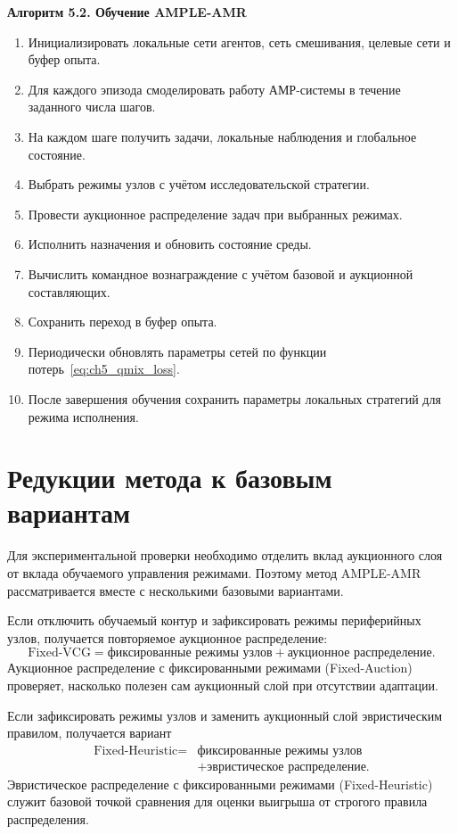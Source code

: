 \textbf{Алгоритм 5.2. Обучение AMPLE-AMR}
\begin{enumerate}
    \item Инициализировать локальные сети агентов, сеть смешивания, целевые сети и буфер опыта.
    \item Для каждого эпизода смоделировать работу АМР-системы в течение заданного числа шагов.
    \item На каждом шаге получить задачи, локальные наблюдения и глобальное состояние.
    \item Выбрать режимы узлов с учётом исследовательской стратегии.
    \item Провести аукционное распределение задач при выбранных режимах.
    \item Исполнить назначения и обновить состояние среды.
    \item Вычислить командное вознаграждение с учётом базовой и аукционной составляющих.
    \item Сохранить переход в буфер опыта.
    \item Периодически обновлять параметры сетей по функции потерь~\eqref{eq:ch5_qmix_loss}.
    \item После завершения обучения сохранить параметры локальных стратегий для режима исполнения.
\end{enumerate}

\section{Редукции метода к базовым вариантам}

Для экспериментальной проверки необходимо отделить вклад аукционного слоя от вклада обучаемого управления режимами. Поэтому метод AMPLE-AMR рассматривается вместе с несколькими базовыми вариантами.

Если отключить обучаемый контур и зафиксировать режимы периферийных узлов, получается повторяемое аукционное распределение:
\begin{equation}
    \text{Fixed-VCG} = \text{фиксированные режимы узлов} + \text{аукционное распределение}.
    \label{eq:ch5_fixed_vcg}
\end{equation}
Аукционное распределение с фиксированными режимами (Fixed-Auction) проверяет, насколько полезен сам аукционный слой при отсутствии адаптации.

Если зафиксировать режимы узлов и заменить аукционный слой эвристическим правилом, получается вариант
\begin{equation}
    \begin{aligned}
    \text{Fixed-Heuristic} ={}& \text{фиксированные режимы узлов} \\
    &+ \text{эвристическое распределение}.
    \end{aligned}
    \label{eq:ch5_fixed_heuristic}
\end{equation}
Эвристическое распределение с фиксированными режимами (Fixed-Heuristic) служит базовой точкой сравнения для оценки выигрыша от строгого правила распределения.

